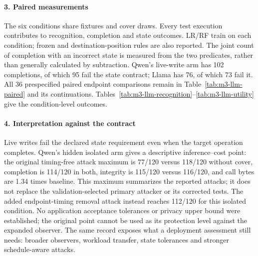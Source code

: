\paragraph{3. Paired measurements}
The six conditions share fixtures and cover draws. Every test execution contributes to recognition, completion and state outcomes. LR/RF train on each condition; frozen and destination-position rules are also reported. The joint count of completion with an incorrect state is measured from the two predicates, rather than generally calculated by subtraction. Qwen's live-write arm has 102 completions, of which 95 fail the state contract; Llama has 76, of which 73 fail it. All 36 prespecified paired endpoint comparisons remain in Table~\ref{tab:m3-llm-paired} and its continuations. Tables~\ref{tab:m3-llm-recognition}--\ref{tab:m3-llm-utility} give the condition-level outcomes.

\paragraph{4. Interpretation against the contract}
Live writes fail the declared state requirement even when the target operation completes. Qwen's hidden isolated arm gives a descriptive inference--cost point: the original timing-free attack maximum is 77/120 versus 118/120 without cover, completion is 114/120 in both, integrity is 115/120 versus 116/120, and call bytes are 1.34 times baseline. This maximum summarizes the reported attacks; it does not replace the validation-selected primary attacker or its corrected tests. The added endpoint-timing removal attack instead reaches 112/120 for this isolated condition. No application acceptance tolerances or privacy upper bound were established; the original point cannot be used as its protection level against the expanded observer. The same record exposes what a deployment assessment still needs: broader observers, workload transfer, state tolerances and stronger schedule-aware attacks.
